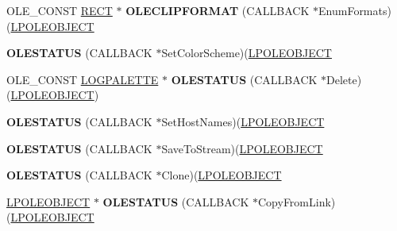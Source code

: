 \begin{DoxyCompactItemize}
\mbox{\label{struct___o_l_e_o_b_j_e_c_t_v_t_b_l_a93e8187cb83bb62c9cfe0206bca822e5}} 
O\+L\+E\+\_\+\+C\+O\+N\+ST \hyperlink{structtag_r_e_c_t}{R\+E\+CT} $\ast$ {\bfseries O\+L\+E\+C\+L\+I\+P\+F\+O\+R\+M\+AT} (C\+A\+L\+L\+B\+A\+CK $\ast$Enum\+Formats)(\hyperlink{struct___o_l_e_o_b_j_e_c_t}{L\+P\+O\+L\+E\+O\+B\+J\+E\+CT}
\item 
\mbox{\label{struct___o_l_e_o_b_j_e_c_t_v_t_b_l_a24b9ff0dba4be04084f02c56ebc89aa6}} 
{\bfseries O\+L\+E\+S\+T\+A\+T\+US} (C\+A\+L\+L\+B\+A\+CK $\ast$Set\+Color\+Scheme)(\hyperlink{struct___o_l_e_o_b_j_e_c_t}{L\+P\+O\+L\+E\+O\+B\+J\+E\+CT}
\item 
\mbox{\label{struct___o_l_e_o_b_j_e_c_t_v_t_b_l_a4f806fd4c89311a5b8cf5d8a5ceb3e08}} 
O\+L\+E\+\_\+\+C\+O\+N\+ST \hyperlink{structtag_l_o_g_p_a_l_e_t_t_e}{L\+O\+G\+P\+A\+L\+E\+T\+TE} $\ast$ {\bfseries O\+L\+E\+S\+T\+A\+T\+US} (C\+A\+L\+L\+B\+A\+CK $\ast$Delete)(\hyperlink{struct___o_l_e_o_b_j_e_c_t}{L\+P\+O\+L\+E\+O\+B\+J\+E\+CT})
\item 
\mbox{\label{struct___o_l_e_o_b_j_e_c_t_v_t_b_l_a9f1cfd8414c4327d1c4116fe1b0130b5}} 
{\bfseries O\+L\+E\+S\+T\+A\+T\+US} (C\+A\+L\+L\+B\+A\+CK $\ast$Set\+Host\+Names)(\hyperlink{struct___o_l_e_o_b_j_e_c_t}{L\+P\+O\+L\+E\+O\+B\+J\+E\+CT}
\item 
\mbox{\label{struct___o_l_e_o_b_j_e_c_t_v_t_b_l_ab0f927f1f3c139ab636d54720af57ea8}} 
{\bfseries O\+L\+E\+S\+T\+A\+T\+US} (C\+A\+L\+L\+B\+A\+CK $\ast$Save\+To\+Stream)(\hyperlink{struct___o_l_e_o_b_j_e_c_t}{L\+P\+O\+L\+E\+O\+B\+J\+E\+CT}
\item 
\mbox{\label{struct___o_l_e_o_b_j_e_c_t_v_t_b_l_a12f800061faae37d19b4c9bebfd87637}} 
{\bfseries O\+L\+E\+S\+T\+A\+T\+US} (C\+A\+L\+L\+B\+A\+CK $\ast$Clone)(\hyperlink{struct___o_l_e_o_b_j_e_c_t}{L\+P\+O\+L\+E\+O\+B\+J\+E\+CT}
\item 
\mbox{\label{struct___o_l_e_o_b_j_e_c_t_v_t_b_l_ad7fe0b3f539ce3d5721b780e4c7202f7}} 
\hyperlink{struct___o_l_e_o_b_j_e_c_t}{L\+P\+O\+L\+E\+O\+B\+J\+E\+CT} $\ast$ {\bfseries O\+L\+E\+S\+T\+A\+T\+US} (C\+A\+L\+L\+B\+A\+CK $\ast$Copy\+From\+Link)(\hyperlink{struct___o_l_e_o_b_j_e_c_t}{L\+P\+O\+L\+E\+O\+B\+J\+E\+CT}

\end{DoxyCompactItemize}
